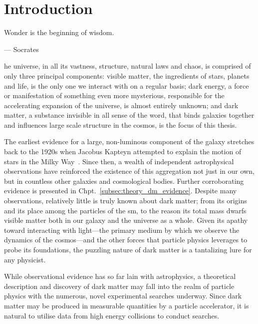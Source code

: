 %
%
\chapter{Introduction}  %
\label{chap:intro}


\epigraph{\hfill Wonder is the beginning of wisdom.}{--- Socrates}  %

he universe, in all its vastness, structure, natural laws and chaos, is comprised of only three principal components: visible matter, the ingredients of stars, planets and life, is the only one we interact with on a regular basis; dark energy, a force or manifestation of something even more mysterious, responsible for the accelerating expansion of the universe, is almost entirely unknown; and dark matter, a substance invisible in all sense of the word, that binds galaxies together and influences large scale structure in the cosmos, is the focus of this thesis.

The earliest evidence for a large, non-luminous component of the galaxy stretches back to the 1920s when Jacobus Kapteyn attempted to explain the motion of stars in the Milky Way~\cite{1922ApJ....55..302K}. Since then, a wealth of independent astrophysical observations have reinforced the existence of this aggregation not just in our own, but in countless other galaxies and cosmological bodies. Further corroborating evidence is presented in Chpt.~\ref{subsec:theory_dm_evidence}. Despite many observations, relatively little is truly known about dark matter; from its origins and its place among the particles of the \acrlong{sm}, to the reason its total mass dwarfs visible matter both in our galaxy and the universe as a whole. Given its apathy toward interacting with light---the primary medium by which we observe the dynamics of the cosmos---and the other forces that particle physics leverages to probe its foundations, the puzzling nature of dark matter is a tantalizing lure for any physicist.

While observational evidence has so far lain with astrophysics, a theoretical description and discovery of dark matter may fall into the realm of particle physics with the numerous, novel experimental searches underway. Since dark matter may be produced in measurable quantities by a particle accelerator, it is natural to utilise data from high energy collisions to conduct searches.

